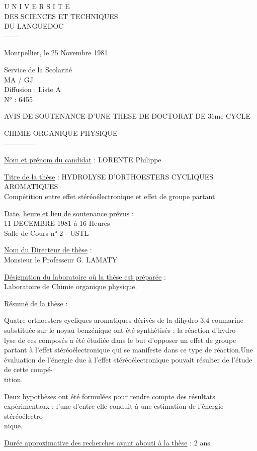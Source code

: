 U N I V E R S I T E\\
DES SCIENCES ET TECHNIQUES\\
DU LANGUEDOC\\
\texttt{------------}

Montpellier, le 25 Novembre 1981

Service de la Scolarité\\
MA / GJ\\
Diffusion : Liste A\\
N° : 6455

AVIS DE SOUTENANCE D'UNE THESE DE DOCTORAT DE 3ème CYCLE

CHIMIE ORGANIQUE PHYSIQUE\\
\texttt{-------------------------}

\uline{Nom et prénom du candidat} : LORENTE Philippe

\uline{Titre de la thèse} : HYDROLYSE D'ORTHOESTERS CYCLIQUES AROMATIQUES\\
Compétition entre effet stéréoélectronique et effet de groupe partant.

\uline{Date, heure et lieu de soutenance prévus} :\\
11 DECEMBRE 1981 à 16 Heures\\
Salle de Cours n° 2 - USTL

\uline{Nom du Directeur de thèse} :\\
Monsieur le Professeur G. LAMATY

\uline{Désignation du laboratoire où la thèse est préparée} :\\
Laboratoire de Chimie organique physique.

\uline{Résumé de la thèse} :

Quatre orthoesters cycliques aromatiques dérivés de la dihydro-3,4 coumarine substituée sur le noyau benzénique ont été synthétisés ; la réaction d'hydro-\\
lyse de ces composés a été étudiée dans le but d'opposer un effet de groupe partant à l'effet stéréoélectronique qui se manifeste dans ce type de réaction.Une évaluation de l'énergie due à l'effet stéréoélectronique pouvait résulter de l'étude de cette compé-\\
tition.

Deux hypothèses ont été formulées pour rendre compte des résultats expérimentaux ; l'une d'entre elle conduit à une estimation de l'énergie stéréoélectro-\\
nique.

\uline{Durée approximative des recherches ayant abouti à la thèse} : 2 ans

